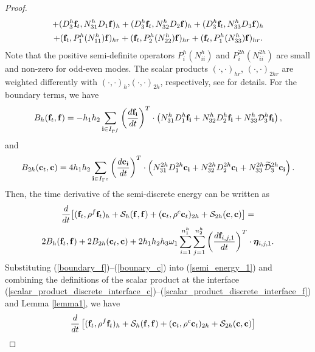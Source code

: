 \begin{proof}
\begin{multline*}
+  ({D}_3^{h}{\bf f}_t,{N}_{31}^{h}{D}_1{\bf f})_{h} 
+  ({D}_3^{h}{\bf f}_t,{N}_{32}^{h}{D}_2{\bf f})_{h} +  ({D}_3^{h}{\bf f}_t,{N}_{33}^{h}{D}_3{\bf f})_{h}\\
+ ({\bf f}_t, P^{h}_1(N_{11}^h){\bf f})_{hr} + ({\bf f}_t, P^{h}_2(N_{22}^h){\bf f})_{hr} + ({\bf f}_t, P^{h}_1(N_{33}^h){\bf f})_{hr}.
\end{multline*}
Note that the positive semi-definite operators $P_i^{h}(N_{ii}^{h})$ and $P_i^{2h}(N_{ii}^{2h})$ are small and non-zero for odd-even modes. The scalar products $(\cdot, \cdot)_{hr}$, $(\cdot,\cdot)_{2hr}$ are weighted differently with $(\cdot, \cdot)_h$,$(\cdot, \cdot)_{2h}$, respectively, see \cite{petersson2015wave,sjogreen2012fourth} for details. For the boundary terms, we have
\begin{equation}\label{boundary_f}
B_h ({\bf f}_t,{\bf f}) = -h_1h_2\sum_{{\bf i}\in I_{\Gamma^f}}\left(\frac{d{\bf f}_{\bf i}}{dt}\right)^T\cdot\left({N}_{31}^h{D}_1^h {\bf f}_{\bf i}+ {N}_{32}^h{D}_2^h{\bf f}_{\bf i}+{N}_{33}^h\mathcal{D}_3^h{\bf f}_{\bf i}\right),
\end{equation}
and 
\begin{equation}\label{bounary_c}
B_{2h} ({\bf c}_t,{\bf c}) = 4h_1h_2\sum_{{\bf i}\in I_{\Gamma^c}}\left(\frac{d{\bf c}_{\bf i}}{dt}\right)^T\cdot\left({N}_{31}^{2h}{D}_1^{2h}{\bf c}_{\bf i}+{N}_{32}^{2h}{D}_2^{2h}{\bf c}_{\bf i}+{N}_{33}^{2h}\wt{\mathcal{D}}_3^{2h}{\bf c}_{\bf i}\right).
\end{equation}
Then, the time derivative of the semi-discrete energy can be written as
\begin{multline}\label{semi_energy_1}
\frac{d}{dt}\big[({\bf f}_t,\rho^f {\bf f}_t)_h + \mathcal{S}_{h}({\bf f},{\bf f}) + ({\bf c}_t,\rho^{c} {\bf c}_t)_{2h} + \mathcal{S}_{2h}({\bf c},{\bf c}) \big]  = \\
2B_{h}({\bf f}_t,{\bf f}) + 2B_{2h}({\bf c}_t,{\bf c}) + 2h_1h_2h_3\omega_1\sum_{i = 1}^{n_1^h}\sum_{j=1}^{n_2^h}\left(\frac{d{\bf f}_{i,j,1}}{dt}\right)^T\cdot{\bm \eta}_{i,j,1}.
\end{multline}
Substituting (\ref{boundary_f})--(\ref{bounary_c}) into (\ref{semi_energy_1}) and combining the definitions of the scalar product at the interface (\ref{scalar_product_discrete_interface_c})--(\ref{scalar_product_discrete_interface_f}) and Lemma \ref{lemma1}, we have
\begin{align*}\label{semi_energy_2}
&\hspace{0.4cm}\frac{d}{dt}\left[({\bf f}_t,\rho^f {\bf f}_t)_{h} + \mathcal{S}_{h}({\bf f},{\bf f}) + ({\bf c}_t,\rho^{c} {\bf c}_t)_{2h} + \mathcal{S}_{2h}({\bf c},{\bf c}) \right]   \nonumber\\

\end{align*}
\end{proof}
